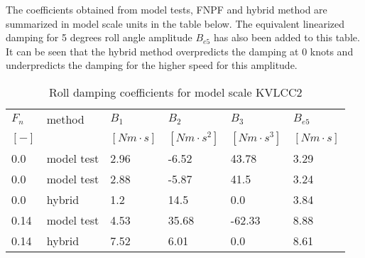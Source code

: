 The coefficients obtained from model tests, FNPF and hybrid method are
summarized in model scale units in the table below. The equivalent
linearized damping for 5 degrees roll angle amplitude $B_{e5}$ has
also been added to this table. It can be seen that the hybrid method
overpredicts the damping at 0 knots and underpredicts the damping for
the higher speed for this amplitude.
\begin{table}[H]
\scriptsize
\center
\caption{Roll damping coefficients for model scale KVLCC2}
\label{tab:results}
\begin{tabular}{|l|l|l|l|l|l|}
\hline\addlinespace
$F_n$ & method & $B_1$ & $B_2$ & $B_3$ & $B_{e5}$\\
$[-]$ &  & $[Nm \cdot s]$ & $[Nm \cdot s^2]$ & $[Nm \cdot s^3]$ & $[Nm \cdot s]$\\
\hline0.0 & model test & 2.96 & -6.52 & 43.78 & 3.29\\
0.0 & model test & 2.88 & -5.87 & 41.5 & 3.24\\
0.0 & hybrid & 1.2 & 14.5 & 0.0 & 3.84\\
0.14 & model test & 4.53 & 35.68 & -62.33 & 8.88\\
0.14 & hybrid & 7.52 & 6.01 & 0.0 & 8.61\\
\hline
\end{tabular}
\end{table}
